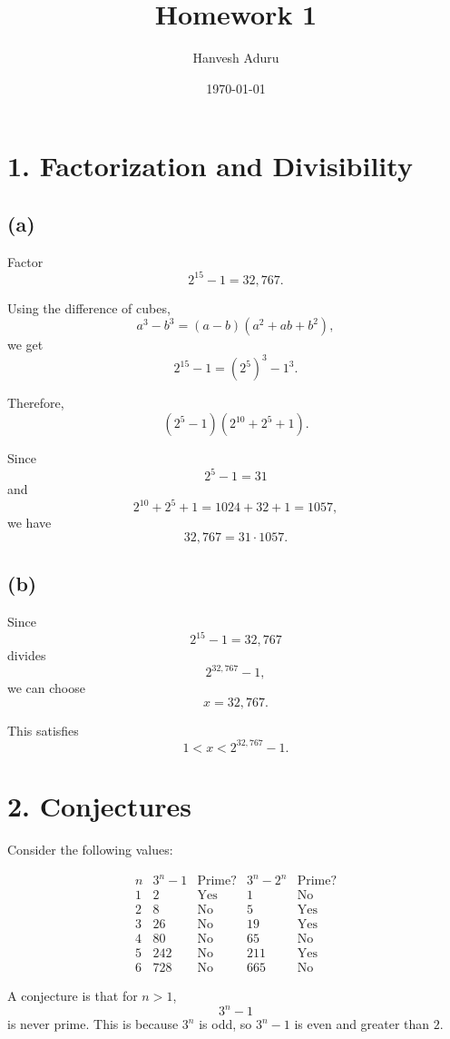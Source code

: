 \documentclass[12pt]{article}
\title{Homework 1}
\author{Hanvesh Aduru}
\date{\today}
\begin{document}
\maketitle

\section*{1. Factorization and Divisibility}

\subsection*{(a)}

Factor
\[
2^{15}-1=32,767.
\]

Using the difference of cubes,
\[
a^3-b^3=(a-b)(a^2+ab+b^2),
\]
we get
\[
2^{15}-1=(2^5)^3-1^3.
\]

Therefore,
\[
(2^5-1)(2^{10}+2^5+1).
\]

Since
\[
2^5-1=31
\]
and
\[
2^{10}+2^5+1=1024+32+1=1057,
\]
we have
\[
\boxed{32,767=31\cdot1057}.
\]

\subsection*{(b)}

Since
\[
2^{15}-1=32,767
\]
divides
\[
2^{32,767}-1,
\]
we can choose
\[
\boxed{x=32,767}.
\]

This satisfies
\[
1<x<2^{32,767}-1.
\]

\section*{2. Conjectures}

Consider the following values:

\[
\begin{array}{c|c|c|c|c}
n & 3^n-1 & \text{Prime?} & 3^n-2^n & \text{Prime?}\\
\hline
1 & 2 & \text{Yes} & 1 & \text{No}\\
2 & 8 & \text{No} & 5 & \text{Yes}\\
3 & 26 & \text{No} & 19 & \text{Yes}\\
4 & 80 & \text{No} & 65 & \text{No}\\
5 & 242 & \text{No} & 211 & \text{Yes}\\
6 & 728 & \text{No} & 665 & \text{No}
\end{array}
\]

A conjecture is that for $n>1$,
\[
3^n-1
\]
is never prime. This is because $3^n$ is odd, so $3^n-1$ is even and greater than $2$.
\end{document}
